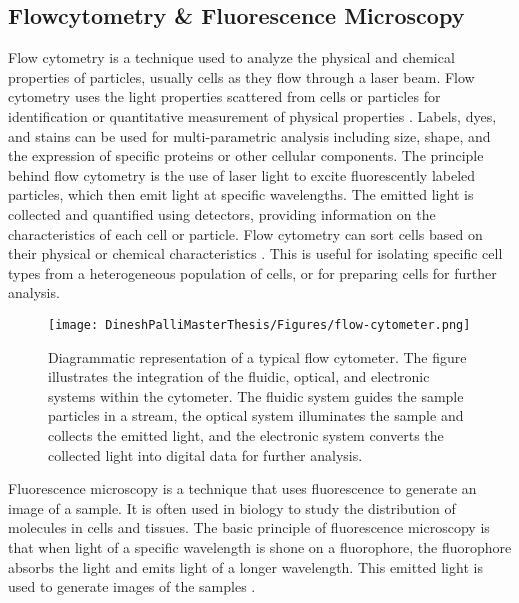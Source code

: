 \documentclass[12pt,a4paper]{article}
\begin{document}
\subsection{Flowcytometry \& Fluorescence Microscopy}

Flow cytometry is a technique used to analyze the physical and chemical properties of particles, usually cells as they flow through a laser beam. Flow cytometry uses the light properties scattered from cells or particles for identification or quantitative measurement of physical properties \cite{mckinnon_2018}. Labels, dyes, and stains can be used for multi-parametric analysis including size, shape, and the expression of specific proteins or other cellular components. The principle behind flow cytometry is the use of laser light to excite fluorescently labeled particles, which then emit light at specific wavelengths. The emitted light is collected and quantified using detectors, providing information on the characteristics of each cell or particle. Flow cytometry can sort cells based on their physical or chemical characteristics \cite{mckinnon_2018}. This is useful for isolating specific cell types from a heterogeneous population of cells, or for preparing cells for further analysis.

\begin{figure}
  \centering
  \texttt{[image: DineshPalliMasterThesis/Figures/flow-cytometer.png]}
  \caption[Diagrammatic representation of a typical flow cytometer]{Diagrammatic representation of a typical flow cytometer. The figure illustrates the integration of the fluidic, optical, and electronic systems within the cytometer. The fluidic system guides the sample particles in a stream, the optical system illuminates the sample and collects the emitted light, and the electronic system converts the collected light into digital data for further analysis. \cite{aatbioFundamentalsFlow}}
  \label{flowcytometry}
\end{figure}

Fluorescence microscopy is a technique that uses fluorescence to generate an image of a sample. It is often used in biology to study the distribution of molecules in cells and tissues. The basic principle of fluorescence microscopy is that when light of a specific wavelength is shone on a fluorophore, the fluorophore absorbs the light and emits light of a longer wavelength. This emitted light is used to generate images of the samples \cite{sanderson_smith_parker_bootman_2014}.
\end{document}
